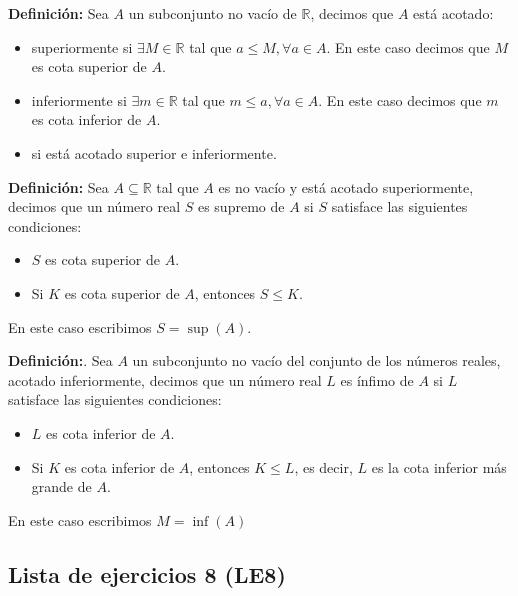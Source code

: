 \documentclass[11pt]{article}
\newcommand{\R}{\mathbb{R}}
\let\subset\subseteq
\begin{document}
\textbf{Definición:} Sea $A$ un subconjunto no vacío de $\R$, decimos que $A$ está acotado:
\begin{itemize}
    \item superiormente si $\exists M\in \R$ tal que $a \leq M, \forall a\in A$. En este caso decimos que $M$ es cota superior de $A$.

    \item inferiormente si $\exists m\in \R$ tal que $m \leq a, \forall a\in A$. En este caso decimos que $m$ es cota inferior de $A$.

    \item si está acotado superior e inferiormente.
\end{itemize}

\textbf{Definición:} Sea $A\subset \R$ tal que $A$ es no vacío y está acotado superiormente, decimos que un número real $S$ es supremo de $A$ si $S$ satisface las siguientes condiciones:
\begin{itemize}
    \item $S$ es cota superior de $A$.
    \item Si $K$ es cota superior de $A$, entonces $S\leq K$.%
\end{itemize}

En este caso escribimos $S=\sup(A)$.

\textbf{Definición:}. Sea $A$ un subconjunto no vacío del conjunto de los números reales, acotado inferiormente, decimos que un número real $L$ es ínfimo de $A$ si $L$ satisface las siguientes condiciones: \begin{itemize}
    \item $L$ es cota inferior de $A$.
    \item Si $K$ es cota inferior de $A$, entonces $K\leq L$, es decir, $L$ es la cota inferior más grande de $A$.
\end{itemize}

En este caso escribimos $M=\inf(A)$

\subsection*{Lista de ejercicios 8 (LE8)}
\end{document}
